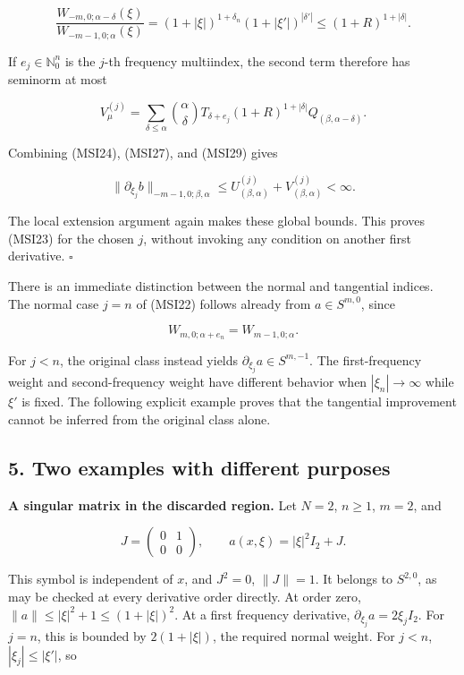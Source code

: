 \documentclass[
  11pt,
]{article}
\begin{document}
\[
\frac{W_{-m,0;\alpha-\delta}(\xi)}
     {W_{-m-1,0;\alpha}(\xi)}
=(1+|\xi|)^{1+\delta_n}
 (1+|\xi'|)^{|\delta'|}
\leq(1+R)^{1+|\delta|}.
\tag{MSI28}
\]

If \(e_j\in\mathbb N_0^n\) is the \(j\)-th frequency multiindex, the
second term therefore has seminorm at most

\[
V_\mu^{(j)}=
\sum_{\delta\leq\alpha}
 \binom\alpha\delta T_{\delta+e_j}
 (1+R)^{1+|\delta|}Q_{(\beta,\alpha-\delta)}.
\tag{MSI29}
\]

Combining (MSI24), (MSI27), and (MSI29) gives

\[
\|\partial_{\xi_j}b\|_{-m-1,0;\beta,\alpha}
\leq U_{(\beta,\alpha)}^{(j)}+V_{(\beta,\alpha)}^{(j)}<\infty.
\tag{MSI30}
\]

The local extension argument again makes these global bounds. This
proves (MSI23) for the chosen \(j\), without invoking any condition on
another first derivative. \(\square\)

There is an immediate distinction between the normal and tangential
indices. The normal case \(j=n\) of (MSI22) follows already from
\(a\in S^{m,0}\), since

\[
W_{m,0;\alpha+e_n}=W_{m-1,0;\alpha}.
\tag{MSI31}
\]

For \(j<n\), the original class instead yields
\(\partial_{\xi_j}a\in S^{m,-1}\). The first-frequency weight and
second-frequency weight have different behavior when
\(|\xi_n|\to\infty\) while \(\xi'\) is fixed. The following explicit
example proves that the tangential improvement cannot be inferred from
the original class alone.

\subsection{5. Two examples with different
purposes}\label{two-examples-with-different-purposes}

\textbf{A singular matrix in the discarded region.} Let \(N=2\),
\(n\geq1\), \(m=2\), and

\[
J=\begin{pmatrix}0&1\\0&0\end{pmatrix},
\qquad
a(x,\xi)=|\xi|^2I_2+J.
\tag{MSI32}
\]

This symbol is independent of \(x\), and \(J^2=0\), \(\|J\|=1\). It
belongs to \(S^{2,0}\), as may be checked at every derivative order
directly. At order zero, \(\|a\|\leq|\xi|^2+1\leq(1+|\xi|)^2\). At a
first frequency derivative, \(\partial_{\xi_j}a=2\xi_jI_2\). For
\(j=n\), this is bounded by \(2(1+|\xi|)\), the required normal weight.
For \(j<n\), \(|\xi_j|\leq|\xi'|\), so
\end{document}
